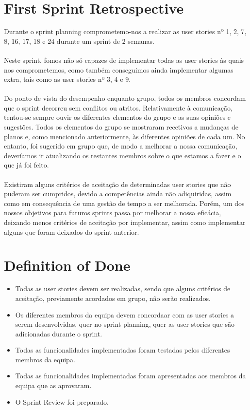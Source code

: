 \documentclass[a4paper,11pt]{article}
\begin{document}
\vspace{130pt}
\section{First Sprint Retrospective}
Durante o sprint planning comprometemo-nos a realizar as user stories nº 1, 2, 7, 8, 16, 17, 18 e 24 durante um sprint de 2 semanas.\\\\
Neste sprint, fomos não só capazes de implementar todas as user stories às quais nos comprometemos, como também conseguimos ainda implementar algumas extra, tais como as user stories nº 3, 4 e 9.\\\\
Do ponto de vista do desempenho enquanto grupo, todos os membros concordam que o sprint decorreu sem conflitos ou atritos. Relativamente à comunicação, tentou-se sempre ouvir os diferentes elementos do grupo e as suas opiniões e sugestões. Todos os elementos do grupo se mostraram recetivos a mudanças de planos e, como mencionado anteriormente, às diferentes opiniões de cada um. No entanto, foi sugerido em grupo que, de modo a melhorar a nossa comunicação, deveríamos ir atualizando os restantes membros sobre o que estamos a fazer e o que já foi feito.\\\\
Existiram alguns critérios de aceitação de determinadas user stories que não puderam ser cumpridos, devido a competências ainda não adiquiridas, assim como em consequência de uma gestão de tempo a ser melhorada. Porém, um dos nossos objetivos para futuros sprints passa por melhorar a nossa eficácia, deixando menos critérios de aceitação por implementar, assim como implementar alguns que foram deixados do sprint anterior.

\vspace{30pt}
\section{Definition of Done}
\begin{itemize}
  \item Todas as user stories devem ser realizadas, sendo que alguns critérios de aceitação, previamente acordados em grupo, não serão realizados.
  \item Os diferentes membros da equipa devem concordaar com as user stories a serem desenvolvidas, quer no sprint planning, quer as user stories que são adicionadas durante o sprint.
  \item Todas as funcionalidades implementadas foram testadas pelos diferentes membros da equipa.
  \item Todas as funcionalidades implementadas foram apresentadas aos membros da equipa que as aprovaram.
  \item O Sprint Review foi preparado.
\end{itemize}
\end{document}
